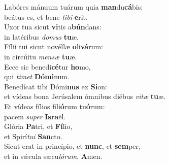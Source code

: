 \evenverse Labóres mánuum tuárum quia \textbf{man}du\textbf{cá}bis:~\*\\
\evenverse beátus es, et bene \textit{ti}\textit{bi} \textbf{e}rit.\\
\oddverse Uxor tua sicut \textbf{vi}tis a\textbf{bún}dans:~\*\\
\oddverse in latéribus \textit{do}\textit{mus} \textbf{tu}æ.\\
\evenverse Fílii tui sicut novéllæ \textbf{o}li\textbf{vá}rum:~\*\\
\evenverse in circúitu \textit{men}\textit{sæ} \textbf{tu}æ.\\
\oddverse Ecce sic benedi\textbf{cé}tur \textbf{ho}mo,~\*\\
\oddverse qui \textit{ti}\textit{met} \textbf{Dó}\textbf{mi}num.\\
\evenverse Benedícat tibi Dómi\textbf{nus} ex \textbf{Si}on:~\*\\
\evenverse et vídeas bona Jerúsalem ómnibus diébus \textit{vi}\textit{tæ} \textbf{tu}æ.\\
\oddverse Et vídeas fílios fili\textbf{ó}rum tu\textbf{ó}rum:~\*\\
\oddverse pacem \textit{su}\textit{per} \textbf{Is}\textbf{ra}ël.\\
\evenverse Glória \textbf{Pa}tri, et \textbf{Fí}lio,~\*\\
\evenverse et Spirí\textit{tu}\textit{i} \textbf{San}cto.\\
\oddverse Sicut erat in princípio, et \textbf{nunc}, et \textbf{sem}per,~\*\\
\oddverse et in sǽcula sæcu\textit{ló}\textit{rum}. \textbf{A}men.\\
